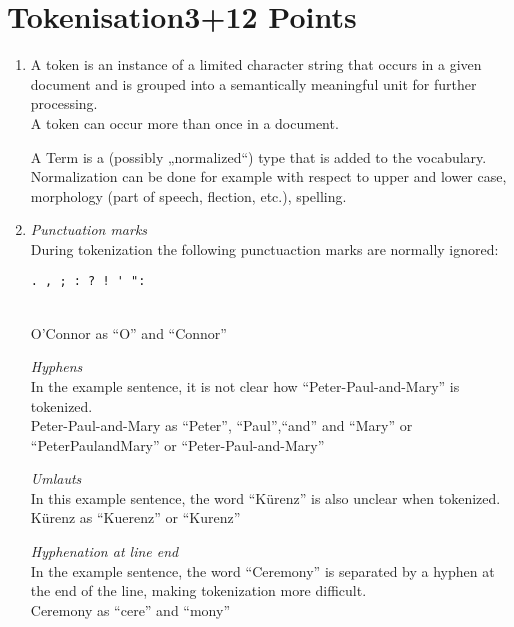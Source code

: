 \documentclass[10pt,a4paper]{article}
\begin{document}
\section{\hfill Tokenisation\hfill 3+12 Points}
\begin{enumerate}
    \item  A token is an instance of a limited character string that occurs in a given document and is grouped into a semantically meaningful unit for further processing.\\
    A token can occur more than once in a document. 
    
    A Term is a (possibly „normalized“) type that is added to the vocabulary. Normalization can be done for example with respect to upper and lower case, morphology (part of speech, flection, etc.), spelling. \\
    
    \item  \textit{Punctuation marks} \\
                 During tokenization the following punctuaction marks are normally ignored: \\
                \vspace*{-2em}\begin{verbatim}. , ; : ? ! ' ": \end{verbatim}\\
                \vspace*{-.8em}O'Connor as \enquote{O} and \enquote{Connor}
                
           \textit{Hyphens} \\
                In the example sentence, it is not clear how \enquote{Peter-Paul-and-Mary} is tokenized. \\
                Peter-Paul-and-Mary as \enquote{Peter}, \enquote{Paul},\enquote{and} and \enquote{Mary} or \enquote{PeterPaulandMary} or \enquote{Peter-Paul-and-Mary}
                
           \textit{Umlauts}\\
                In this example sentence, the word \enquote{Kürenz} is also unclear when tokenized. \\
                Kürenz as \enquote{Kuerenz} or \enquote{Kurenz}
                
          \textit{Hyphenation at line end} \\
                In the example sentence, the word \enquote{Ceremony} is separated by a hyphen at the end of the line, making tokenization more difficult. \\
                Ceremony as \enquote{cere} and \enquote{mony}
\end{enumerate} 
\end{document}
